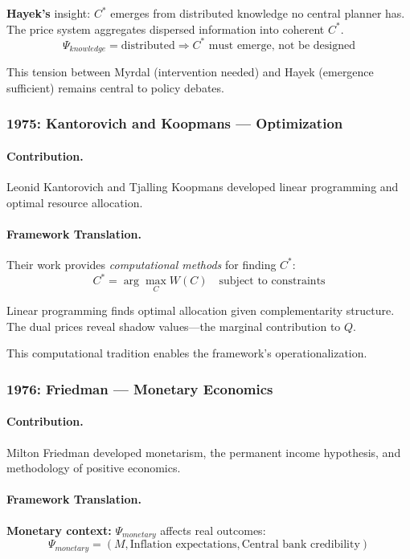 \textbf{Hayek's} insight: $C^*$ emerges from distributed knowledge no central planner has.
The price system aggregates dispersed information into coherent $C^*$.
\begin{equation}
  \Psi_{knowledge} = \text{distributed} \Rightarrow C^* \text{ must emerge, not be designed}
\end{equation}

This tension between Myrdal (intervention needed) and Hayek (emergence sufficient)
remains central to policy debates.

\subsubsection{1975: Kantorovich and Koopmans --- Optimization}

\paragraph{Contribution.}
Leonid Kantorovich and Tjalling Koopmans developed linear programming
and optimal resource allocation.

\paragraph{Framework Translation.}
Their work provides \emph{computational methods} for finding $C^*$:
\begin{equation}
  C^* = \arg\max_{C} W(C) \quad \text{subject to constraints}
\end{equation}

Linear programming finds optimal allocation given complementarity structure.
The dual prices reveal shadow values---the marginal contribution to $Q$.

This computational tradition enables the framework's operationalization.

\subsubsection{1976: Friedman --- Monetary Economics}

\paragraph{Contribution.}
Milton Friedman developed monetarism, the permanent income hypothesis,
and methodology of positive economics.

\paragraph{Framework Translation.}
\textbf{Monetary context:} $\Psi_{monetary}$ affects real outcomes:
\begin{equation}
  \Psi_{monetary} = (M, \text{Inflation expectations}, \text{Central bank credibility})
\end{equation}

